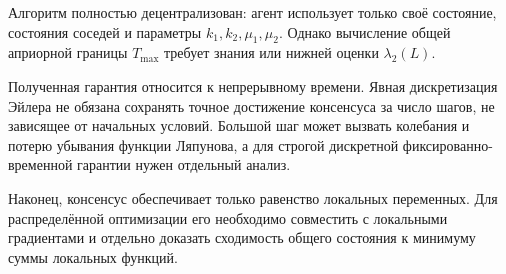 Алгоритм полностью децентрализован: агент использует только своё
состояние, состояния соседей и параметры
\(k_1,k_2,\mu_1,\mu_2\). Однако вычисление общей априорной границы
\(T_{\max}\) требует знания или нижней оценки
\(\lambda_2(L)\).

Полученная гарантия относится к непрерывному времени. Явная
дискретизация Эйлера не обязана сохранять точное достижение
консенсуса за число шагов, не зависящее от начальных условий. Большой
шаг может вызвать колебания и потерю убывания функции Ляпунова, а для
строгой дискретной фиксированно-временной гарантии нужен отдельный
анализ.

Наконец, консенсус обеспечивает только равенство локальных
переменных. Для распределённой оптимизации его необходимо совместить
с локальными градиентами и отдельно доказать сходимость общего
состояния к минимуму суммы локальных функций.
